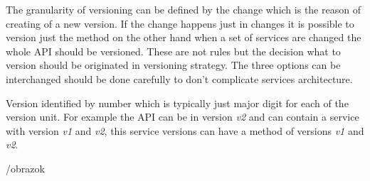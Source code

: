 The granularity of versioning can be defined by the change which is the reason of creating of a new version. If the change happens just in changes it is possible to version just the method on the other hand when a set of services are changed the whole API should be versioned. These are not rules but the decision what to version should be originated in versioning strategy. The three options can be interchanged should be done carefully to don't complicate services architecture.

Version identified by number which is typically just major digit for each of the version unit. For example the API can be in version \emph{v2} and can contain a service with version \emph{v1} and \emph{v2}, this service versions can have a method of versions \emph{v1} and \emph{v2}.

/obrazok

